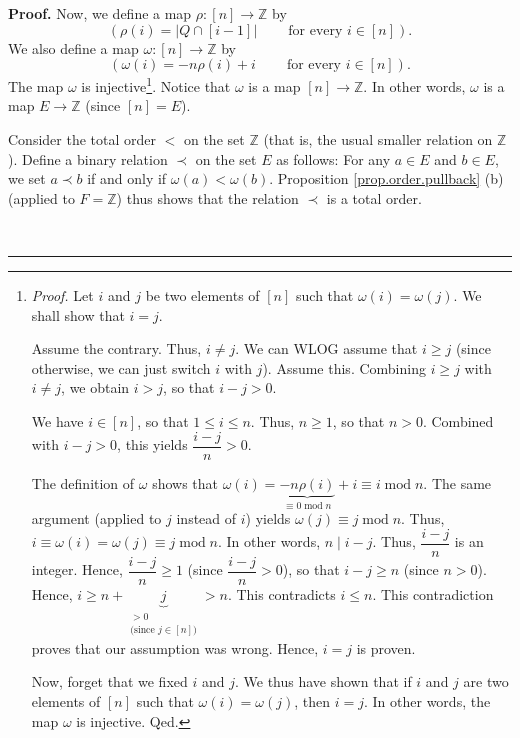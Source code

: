 \documentclass[numbers=enddot,12pt,final,onecolumn,notitlepage,abstracton]{scrartcl}
\theoremstyle{definition}
\newenvironment{proof}[1][Proof]{\noindent\textbf{#1.} }{\ \rule{0.5em}{0.5em}}
\newenvironment{verlong}{}{}
\begin{document}
\begin{verlong}
\begin{footnotesize}
\begin{proof}
Now, we define a map $\rho:\left[  n\right]  \rightarrow\mathbb{Z}$ by%
\[
\left(  \rho\left(  i\right)  =\left\vert Q\cap\left[  i-1\right]  \right\vert
\ \ \ \ \ \ \ \ \ \ \text{for every }i\in\left[  n\right]  \right)  .
\]
We also define a map $\omega:\left[  n\right]  \rightarrow\mathbb{Z}$ by%
\[
\left(  \omega\left(  i\right)  =-n\rho\left(  i\right)
+i\ \ \ \ \ \ \ \ \ \ \text{for every }i\in\left[  n\right]  \right)  .
\]
The map $\omega$ is injective\footnote{\textit{Proof.} Let $i$ and $j$ be two
elements of $\left[  n\right]  $ such that $\omega\left(  i\right)
=\omega\left(  j\right)  $. We shall show that $i=j$.
\par
Assume the contrary. Thus, $i\neq j$. We can WLOG assume that $i\geq j$ (since
otherwise, we can just switch $i$ with $j$). Assume this. Combining $i\geq j$
with $i\neq j$, we obtain $i>j$, so that $i-j>0$.
\par
We have $i\in\left[  n\right]  $, so that $1\leq i\leq n$. Thus, $n\geq1$, so
that $n>0$. Combined with $i-j>0$, this yields $\dfrac{i-j}{n}>0$.
\par
The definition of $\omega$ shows that $\omega\left(  i\right)
=\underbrace{-n\rho\left(  i\right)  }_{\equiv0\operatorname{mod}n}+i\equiv
i\operatorname{mod}n$. The same argument (applied to $j$ instead of $i$)
yields $\omega\left(  j\right)  \equiv j\operatorname{mod}n$. Thus,
$i\equiv\omega\left(  i\right)  =\omega\left(  j\right)  \equiv
j\operatorname{mod}n$. In other words, $n\mid i-j$. Thus, $\dfrac{i-j}{n}$ is
an integer. Hence, $\dfrac{i-j}{n}\geq1$ (since $\dfrac{i-j}{n}>0$), so that
$i-j\geq n$ (since $n>0$). Hence, $i\geq n+\underbrace{j}%
_{\substack{>0\\\text{(since }j\in\left[  n\right]  \text{)}}}>n$. This
contradicts $i\leq n$. This contradiction proves that our assumption was
wrong. Hence, $i=j$ is proven.
\par
Now, forget that we fixed $i$ and $j$. We thus have shown that if $i$ and $j$
are two elements of $\left[  n\right]  $ such that $\omega\left(  i\right)
=\omega\left(  j\right)  $, then $i=j$. In other words, the map $\omega$ is
injective. Qed.}. Notice that $\omega$ is a map $\left[  n\right]
\rightarrow\mathbb{Z}$. In other words, $\omega$ is a map $E\rightarrow
\mathbb{Z}$ (since $\left[  n\right]  =E$).

Consider the total order $<$ on the set $\mathbb{Z}$ (that is, the usual
smaller relation on $\mathbb{Z}$). Define a binary relation $\prec$ on the set
$E$ as follows: For any $a\in E$ and $b\in E$, we set $a\prec b$ if and only
if $\omega\left(  a\right)  <\omega\left(  b\right)  $. Proposition
\ref{prop.order.pullback} (b) (applied to $F=\mathbb{Z}$) thus shows that the
relation $\prec$ is a total order.


\end{proof}
\end{footnotesize}
\end{verlong}
\end{document}
